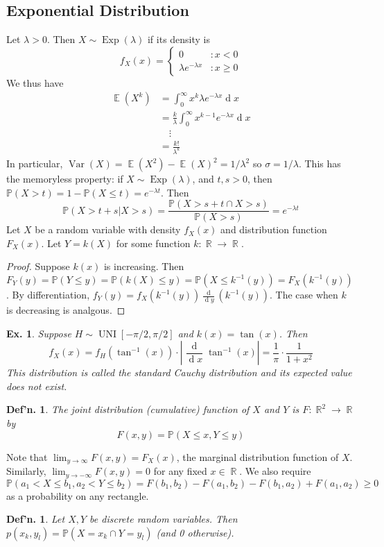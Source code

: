 \documentclass[12pt, a4paper]{book}
\DeclareMathOperator{\R}{\mathbb{R}}
\DeclareMathOperator{\E}{\mathbb{E}}
\DeclareMathOperator{\Exp}{Exp}
\DeclareMathOperator{\Var}{Var}
\DeclareMathOperator{\UNI}{UNI}
\renewcommand{\Pr}{\mathbb{P}}
\renewcommand{\d}[1]{\ensuremath{\operatorname{d}\!{#1}}} %
\newtheorem{definition}[theorem]{Def'n.}
\newtheorem{example}[theorem]{Ex.}
\theoremstyle{nonumberplain}
\newtheorem{proof}{Proof}
\begin{document}
\subsection{Exponential Distribution}
Let $\lambda>0$.
Then $X\sim\Exp(\lambda)$ if its density is
\[f_X(x)=\begin{cases}0 &:x<0\\\lambda e^{-\lambda x} &: x\geq 0\end{cases}\]
We thus have
\begin{align*}
    \E(X^k) &= \int_0^\infty x^k\lambda e^{-\lambda x}\d{x}\\
            &= \frac{k}{\lambda}\int_0^\infty x^{k-1}e^{-\lambda x}\d{x}\\
            &\quad\vdots\\
            &= \frac{k!}{\lambda^k}
\end{align*}
In particular, $\Var(X)=\E(X^2)-\E(X)^2=1/\lambda^2$ so $\sigma=1/\lambda$.
This has the memoryless property: if $X\sim\Exp(\lambda)$, and $t,s>0$, then $\Pr(X>t)=1-\Pr(X\leq t)=e^{-\lambda t}$.
Then
\[\Pr(X>t+s|X>s) = \frac{\Pr(X>s+t\cap X>s)}{\Pr(X>s)}=e^{-\lambda t}\]
Let $X$ be a random variable with density $f_X(x)$ and distribution function $F_X(x)$.
Let $Y=k(X)$ for some function $k:\R\to\R$.
\begin{proof}
    Suppose $k(x)$ is increasing.
    Then $F_Y(y)=\Pr(Y\leq y)=\Pr(k(X)\leq y)=\Pr(X\leq k^{-1}(y))=F_X(k^{-1}(y))$.
    By differentiation, $f_Y(y)=f_X(k^{-1}(y))\frac{\d{}}{\d{y}}(k^{-1}(y))$.
    The case when $k$ is decreasing is analgous.
\end{proof}
\begin{example}
    Suppose $H\sim\UNI[-\pi/2,\pi/2]$ and $k(x)=\tan(x)$.
    Then
    \[f_X(x)=f_H(\tan^{-1}(x))\cdot\left\lvert\frac{\d{}}{\d{x}}\tan^{-1}(x)\right\rvert=\frac{1}{\pi}\cdot\frac{1}{1+x^2}\]
    This distribution is called the standard Cauchy distribution and its expected value does not exist.
\end{example}
\begin{definition}
    The joint distribution (cumulative) function of $X$ and $Y$ is $F:\R^2\to\R$ by
    \[F(x,y)=\Pr(X\leq x,Y\leq y)\]
\end{definition}
Note that $\lim_{y\to\infty}F(x,y)=F_X(x)$, the marginal distribution function of $X$.
Similarly, $\lim_{y\to-\infty}F(x,y)=0$ for any fixed $x\in\R$.
We also require $\Pr(a_1<X\leq b_1,a_2<Y\leq b_2)=F(b_1,b_2)-F(a_1,b_2)-F(b_1,a_2)+F(a_1,a_2)\geq0$ as a probability on any rectangle.
\begin{definition}
    Let $X,Y$ be discrete random variables.
    Then $p(x_k,y_l)=\Pr(X=x_k\cap Y=y_l)$ (and 0 otherwise).
\end{definition}
\end{document}

